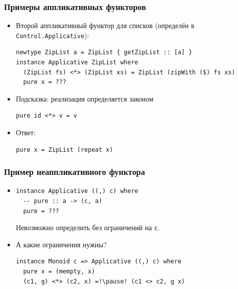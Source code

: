 \documentclass[11pt]{beamer}
\begin{document}
\begin{frame}[fragile]
\frametitle{Примеры аппликативных функторов}
\begin{itemize}
    \item Второй аппликативный функтор для списков (определён в \lstinline|Control.Applicative|):
\begin{lstlisting}[basicstyle=\ttfamily\small]
newtype ZipList a = ZipList { getZipList :: [a] }
instance Applicative ZipList where 
  (ZipList fs) <*> (ZipList xs) = ZipList (zipWith ($) fs xs)
  pure x = ???
\end{lstlisting}
    \pause
    \item Подсказка: реализация определяется законом
\begin{lstlisting}[basicstyle=\ttfamily\small]
pure id <*> v = v
\end{lstlisting}
    \pause
    \item Ответ: 
\begin{lstlisting}[basicstyle=\ttfamily\small]
pure x = ZipList (repeat x)
\end{lstlisting}
\end{itemize}
\end{frame}

\begin{frame}[fragile]
\frametitle{Пример неаппликативного функтора}
\begin{itemize}
    \item 
\begin{lstlisting}[basicstyle=\ttfamily\small]
instance Applicative ((,) c) where 
  -- pure :: a -> (c, a)
  pure = ???
\end{lstlisting}
    \pause Невозможно определить без ограничений на \lstinline|c|.
    \pause
    \item А какие ограничения нужны? \pause
\begin{lstlisting}[basicstyle=\ttfamily\small]
instance Monoid c => Applicative ((,) c) where
  pure x = (mempty, x)
  (c1, g) <*> (c2, x) =!\pause! (c1 <> c2, g x)
\end{lstlisting}
\end{itemize}
\end{frame}
\end{document}
